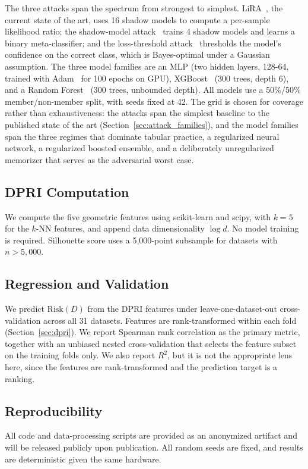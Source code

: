 The three attacks span the spectrum from strongest to simplest.
LiRA~\cite{carlini2022lira}, the current state of the art, uses 16
shadow models to compute a per-sample likelihood ratio; the shadow-model
attack~\cite{shokri2017membership} trains 4 shadow models and learns a
binary meta-classifier; and the loss-threshold
attack~\cite{yeom2018privacy} thresholds the model's confidence on the
correct class, which is Bayes-optimal under a Gaussian assumption. The
three model families are an MLP (two hidden layers, 128-64, trained with
Adam~\cite{kingma2015adam} for 100 epochs on GPU),
XGBoost~\cite{chen2016xgboost} (300 trees, depth 6), and a Random
Forest~\cite{breiman2001random} (300 trees, unbounded depth). All models
use a 50\%/50\% member/non-member split, with seeds fixed at 42.
The grid is chosen for coverage rather than exhaustiveness: the attacks
span the simplest baseline to the published state of the art
(Section~\ref{sec:attack_families}), and the model families span the
three regimes that dominate tabular practice, a regularized neural
network, a regularized boosted ensemble, and a deliberately
unregularized memorizer that serves as the adversarial worst case.

\subsection{DPRI Computation}

We compute the five geometric features using scikit-learn and scipy, with
$k=5$ for the $k$-NN features, and append data dimensionality $\log d$. No
model training is required. Silhouette score uses a 5,000-point subsample for
datasets with $n > 5{,}000$.

\subsection{Regression and Validation}

We predict $\mathrm{Risk}(D)$ from the DPRI features under
leave-one-dataset-out cross-validation across all 31 datasets. Features are
rank-transformed within each fold (Section~\ref{sec:dpri}). We report Spearman
rank correlation as the primary metric, together with an unbiased nested
cross-validation that selects the feature subset on the training folds only.
We also report $R^2$, but it is not the appropriate lens here, since the
features are rank-transformed and the prediction target is a ranking.

\subsection{Reproducibility}

All code and data-processing scripts are provided as an anonymized
artifact and will be released publicly upon publication.
All random seeds are fixed, and results are deterministic given the same
hardware.
